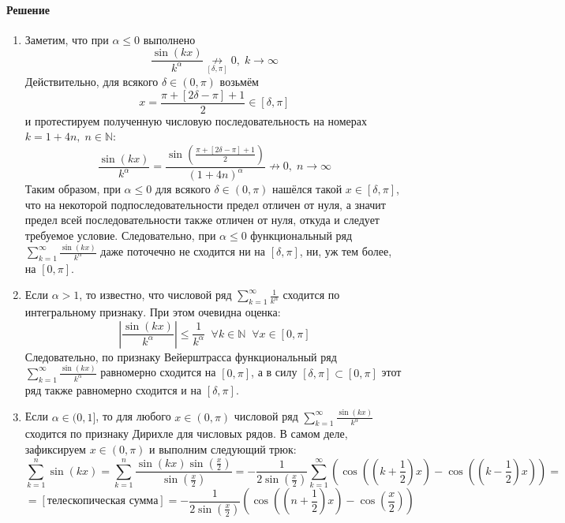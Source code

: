 \documentclass[11pt]{article}
\begin{document}
\paragraph{Решение}
\begin{enumerate}
    \item Заметим, что при $\alpha \leq 0$ выполнено
    \[\frac{\sin (kx)}{k^{\alpha}} \underset{[\delta, \pi]}{\not \to} 0, \; k \to \infty\]
    Действительно, для всякого $\delta \in (0, \pi)$ возьмём 
    \[x = \frac{\pi + [2\delta - \pi] + 1}{2} \in [\delta, \pi]\] 
    и протестируем полученную числовую последовательность на номерах $k = 1 + 4n, \; n \in \mathbb{N}:$
    \[\frac{\sin (kx)}{k^{\alpha}} = \frac{\sin \left(\displaystyle \frac{\pi + [2\delta - \pi] + 1}{2}\right)}{(1 + 4n)^{\alpha}} \not \to 0, \; n \to \infty\]
    Таким образом, при $\alpha \leq 0$ для всякого $\delta \in (0, \pi)$ нашёлся такой $x \in [\delta, \pi]$, что на некоторой подпоследовательности предел отличен от нуля, а значит предел всей последовательности также отличен от нуля, откуда и следует требуемое условие.
    Следовательно, при $\alpha \leq 0$ функциональный ряд $\displaystyle \sum_{k = 1}^{\infty} \frac{\sin (kx)}{k^{\alpha}}$ даже поточечно не сходится ни на $[\delta, \pi]$, ни, уж тем более, на $[0, \pi]$.
    \item Если $\alpha > 1$, то известно, что числовой ряд $\displaystyle \sum_{k = 1}^{\infty} \frac{1}{k^{\alpha}}$ сходится по интегральному признаку. При этом очевидна оценка:
    \[\left\lvert \frac{\sin (kx)}{k^{\alpha}} \right\rvert \leq \frac{1}{k^{\alpha}} \; \; \forall k \in \mathbb{N} \; \; \forall x \in [0, \pi]\]
    Следовательно, по признаку Вейерштрасса функциональный ряд $\displaystyle \sum_{k = 1}^{\infty} \frac{\sin (kx)}{k^{\alpha}}$ равномерно сходится на $[0, \pi]$, а в силу $[\delta, \pi] \subset [0, \pi]$  этот ряд также равномерно сходится и на $[\delta, \pi]$.
    \item Если $\alpha \in (0, 1]$, то для любого $x \in (0, \pi)$ числовой ряд $\displaystyle \sum_{k = 1}^{\infty} \frac{\sin (kx)}{k^{\alpha}}$ сходится по признаку Дирихле для числовых рядов.
    В самом деле, зафиксируем $x \in (0, \pi)$ и выполним следующий трюк:
    \[\sum_{k = 1}^n \sin (kx) = \sum_{k = 1}^n \frac{\sin (kx) \sin\left(\displaystyle \frac{x}{2}\right)}{\sin \left(\displaystyle \frac{x}{2}\right)} = - \frac{1}{2 \sin \left(\displaystyle \frac{x}{2}\right)} \sum_{k = 1}^{\infty} \left( \cos\left(\left(k + \frac{1}{2}\right) x\right) - \cos \left( \left(k - \frac{1}{2}\right) x \right) \right) = \]
    \[= [\text{телескопическая сумма}] = - \frac{1}{2 \sin \left(\displaystyle \frac{x}{2}\right)} \left( \cos \left( \left( n + \frac{1}{2} \right) x \right) - \cos \left(\frac{x}{2} \right) \right)\]

\end{enumerate}
\end{document}
